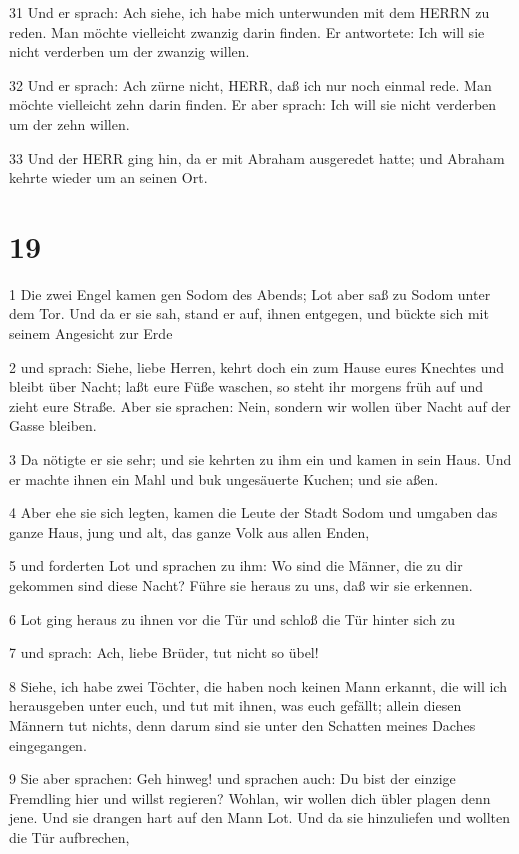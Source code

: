 \par 31 Und er sprach: Ach siehe, ich habe mich unterwunden mit dem HERRN zu reden. Man möchte vielleicht zwanzig darin finden. Er antwortete: Ich will sie nicht verderben um der zwanzig willen.
\par 32 Und er sprach: Ach zürne nicht, HERR, daß ich nur noch einmal rede. Man möchte vielleicht zehn darin finden. Er aber sprach: Ich will sie nicht verderben um der zehn willen.
\par 33 Und der HERR ging hin, da er mit Abraham ausgeredet hatte; und Abraham kehrte wieder um an seinen Ort.

\chapter{19}

\par 1 Die zwei Engel kamen gen Sodom des Abends; Lot aber saß zu Sodom unter dem Tor. Und da er sie sah, stand er auf, ihnen entgegen, und bückte sich mit seinem Angesicht zur Erde
\par 2 und sprach: Siehe, liebe Herren, kehrt doch ein zum Hause eures Knechtes und bleibt über Nacht; laßt eure Füße waschen, so steht ihr morgens früh auf und zieht eure Straße. Aber sie sprachen: Nein, sondern wir wollen über Nacht auf der Gasse bleiben.
\par 3 Da nötigte er sie sehr; und sie kehrten zu ihm ein und kamen in sein Haus. Und er machte ihnen ein Mahl und buk ungesäuerte Kuchen; und sie aßen.
\par 4 Aber ehe sie sich legten, kamen die Leute der Stadt Sodom und umgaben das ganze Haus, jung und alt, das ganze Volk aus allen Enden,
\par 5 und forderten Lot und sprachen zu ihm: Wo sind die Männer, die zu dir gekommen sind diese Nacht? Führe sie heraus zu uns, daß wir sie erkennen.
\par 6 Lot ging heraus zu ihnen vor die Tür und schloß die Tür hinter sich zu
\par 7 und sprach: Ach, liebe Brüder, tut nicht so übel!
\par 8 Siehe, ich habe zwei Töchter, die haben noch keinen Mann erkannt, die will ich herausgeben unter euch, und tut mit ihnen, was euch gefällt; allein diesen Männern tut nichts, denn darum sind sie unter den Schatten meines Daches eingegangen.
\par 9 Sie aber sprachen: Geh hinweg! und sprachen auch: Du bist der einzige Fremdling hier und willst regieren? Wohlan, wir wollen dich übler plagen denn jene. Und sie drangen hart auf den Mann Lot. Und da sie hinzuliefen und wollten die Tür aufbrechen,
